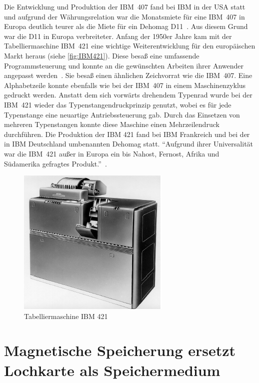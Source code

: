 \documentclass[parskip=half]{scrartcl}
\begin{document}
Die Entwicklung und Produktion der IBM~407 fand bei IBM in der USA statt und
aufgrund der Währungsrelation war die Monatsmiete für eine IBM~407 in Europa
deutlich teurer als die Miete für ein Dehomag D11~\cite{sandner}. Aus diesem
Grund war die D11 in Europa verbreiteter. Anfang der 1950er Jahre kam mit der
Tabelliermaschine IBM~421 eine wichtige Weiterentwicklung für den europäischen
Markt heraus (siehe \autoref{fig:IBM421}). Diese besaß eine umfassende
Programmsteuerung und konnte an die gewünschten Arbeiten ihrer Anwender
angepasst werden~\cite{deutschesMuseum}. Sie besaß einen ähnlichen Zeichvorrat wie die IBM~407. Eine Alphabetzeile konnte ebenfalls
wie bei der IBM~407 in einem Maschinenzyklus gedruckt werden. Anstatt dem sich
vorwärts drehendem Typenrad wurde bei der IBM~421 wieder das
Typenstangendruckprinzip genutzt, wobei es für jede Typenstange eine neuartige
Antriebssteuerung gab. Durch das Einsetzen von mehreren Typenstangen konnte diese Maschine einen Mehrzeilendruck durchführen. Die Produktion der IBM 421 fand bei IBM Frankreich und
bei der in IBM Deutschland umbenannten Dehomag statt. \enquote{Aufgrund ihrer
Universalität war die IBM~421 außer in Europa ein bis Nahost, Fernost, Afrika und
Südamerika gefragtes Produkt.}~\cite{sandner}.

\begin{figure}[h]
  \centering
  \includegraphics{IBM421}
  \caption{Tabelliermaschine IBM 421~\cite{sandner}}
  \label{fig:IBM421}
\end{figure}

\section{Magnetische Speicherung ersetzt Lochkarte als Speichermedium}
\end{document}
